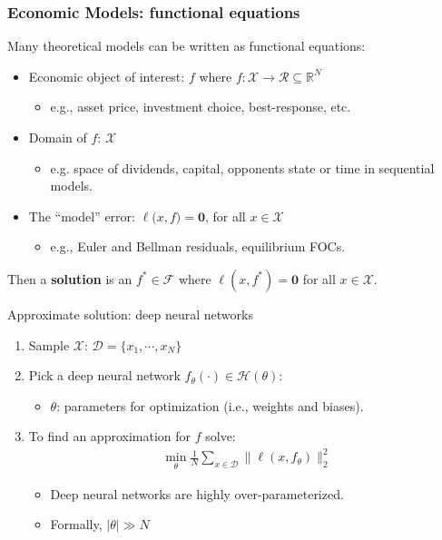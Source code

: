 \documentclass[aspectratio=169,10pt]{beamer}
\newcommand{\emphcolor}[1]{\textbf{\textcolor{emphcolorval}{#1}}}
\newcommand{\Xdom}{\mathcal{X}}
\newcommand{\F}{\mathcal{F}}
\begin{document}
\begin{frame}
	\frametitle{Economic Models: functional equations}
	Many theoretical models can be written as functional equations:
	\begin{itemize}
		\item Economic object of interest: $f $ where $f : \Xdom\to \mathcal{R}\subseteq \mathbb{R}^N$ 
		\begin{itemize}
			\item e.g., asset price, investment choice, best-response, etc.
		\end{itemize}
			\vspace{0.1in}
		\item Domain of $f$: $\Xdom$  
		\begin{itemize}
			\item e.g. space of dividends, capital, opponents state or time in sequential models.
		\end{itemize}
			\vspace{0.1in}
		\item The ``model'' error:  $\ell \big(x,f\big) = \mathbf{0}$,  for all $x\in \Xdom$  
		\begin{itemize}
			\item e.g., Euler and Bellman residuals, equilibrium FOCs.
		\end{itemize}
		\vspace{0.1in}
	\end{itemize}
	Then a \emphcolor{solution} is an $f^*\in \F$ where $\ell(x,f^*) = \mathbf{0}$ for all $x \in \Xdom$.\vspace{0.1in}
\end{frame}

\begin{frame}{Approximate solution: deep neural networks }
	\begin{enumerate}
		\item Sample $\mathcal{X}$: $\mathcal{D} = \{x_1,\cdots,x_N\}$
		\vspace{0.025in}
		\item Pick a deep neural network $f_\theta(\cdot) \in \mathcal{H}(\theta)$:
		\begin{itemize}
			\item $\theta$: parameters for optimization (i.e., weights and biases).  
		\end{itemize}
		\vspace{0.025in}
		\item To find an approximation for $f$ solve:
		\begin{align*}
			\min_{\theta } \frac{1}{N}\sum_{x \in \mathcal{D}} \|\ell(x,f_\theta)\|_2^2
		\end{align*}
		\begin{itemize}
			\item Deep neural networks are highly over-parameterized.
			\item Formally, $|\theta|\gg N$ 
		\end{itemize}
	\end{enumerate}
\end{frame}
\end{document}
